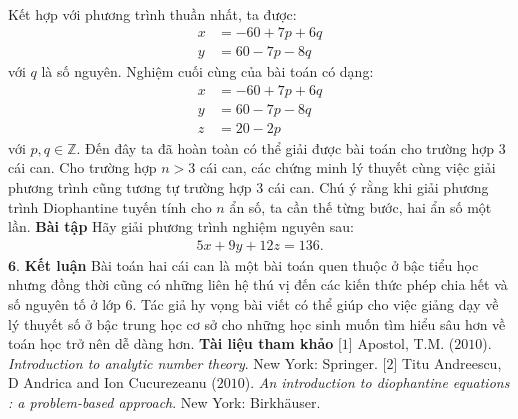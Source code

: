 \begin{multicols}{2}
\begin{align*}
	\end{align*}
	Kết hợp với phương trình thuần nhất, ta được:
	\begin{align*}
		x&=-60+7p+6q\\
		y&=60-7p-8q
	\end{align*}
	với $q$ là số nguyên.
	\vskip 0.1cm
	Nghiệm cuối cùng của bài toán có dạng:
	\begin{align*}
		x&=-60+7p+6q\\
		y&=60-7p-8q\\
		z&=20-2p
	\end{align*}
	với $p,q \in \mathbb{Z}$.
	\vskip 0.1cm
	Đến đây ta đã hoàn toàn có thể giải được bài toán cho trường hợp $3$ cái can.
	\vskip 0.1cm
	Cho trường hợp $n>3$ cái can, các chứng minh lý thuyết cùng việc giải phương trình cũng tương tự trường hợp $3$ cái can. Chú ý rằng khi giải phương trình Diophantine tuyến tính cho $n$ ẩn số, ta cần thế từng bước, hai ẩn số một lần.
	\vskip 0.1cm
	\textbf{\color{hoccungpi}Bài tập}
	\vskip 0.1cm
	Hãy giải phương trình nghiệm nguyên sau:
	\begin{align*}
		5x+9y+12z=136.
	\end{align*}
	$\pmb{6.}$ \textbf{\color{hoccungpi}Kết luận}
	\vskip 0.1cm
	Bài toán hai cái can là một bài toán quen thuộc ở bậc tiểu học nhưng đồng thời cũng có những liên hệ thú vị đến các kiến thức phép chia hết và số nguyên tố ở lớp $6$. Tác giả hy vọng bài viết có thể giúp cho việc giảng dạy về lý thuyết số ở bậc trung học cơ sở cho những học sinh muốn tìm hiểu sâu hơn về toán học trở nên dễ dàng hơn.
	\vskip 0.1cm
	\textbf{\color{hoccungpi}Tài liệu tham khảo}
	\vskip 0.1cm
	[$1$] Apostol, T.M. ($2010$). \textit{Introduction to analytic number theory}. New York: Springer.
	\vskip 0.1cm
	[$2$] Titu Andreescu, D Andrica and Ion Cucurezeanu ($2010$). \textit{An introduction to diophantine equations : a problem-based approach}. New York: Birkhäuser.
\end{multicols}